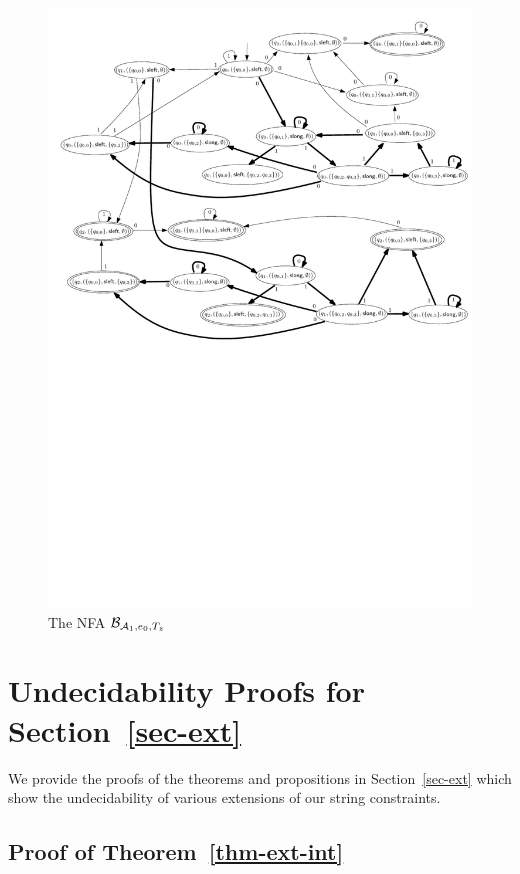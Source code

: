 \begin{example}
\begin{figure}[htbp]
\begin{center}
			\includegraphics[scale=0.68]{regular-expression-example-2.pdf}
		\end{center}
		\caption{The NFA $\mathcal{B}_{\mathcal{A}_1, e_0, T_z}$}\label{fig-re-exmp}
	\end{figure} 
\end{example}



\def\refsecext{\ref{sec-ext}}
\section{Undecidability Proofs for Section~\protect\refsecext}
\label{sec:ext-undec-proofs}

We provide the proofs of the theorems and propositions in Section~\ref{sec-ext} which show the undecidability of various extensions of our string constraints.

\subsection{Proof of Theorem~\ref{thm-ext-int}}

